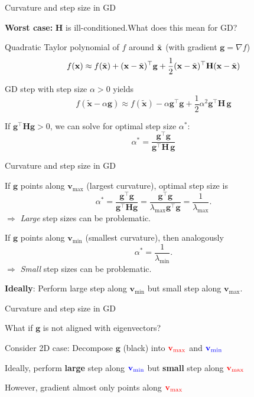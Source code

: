 \documentclass[11pt,compress,t,notes=noshow, xcolor=table]{beamer}
\begin{document}
\begin{framei}{Curvature and step size in GD}
\item\textbf{Worst case:} $\mathbf{H}$ is ill-conditioned.What does this mean for GD?
\vfill
\begin{itemizeM}
\item Quadratic Taylor polynomial of $f$ around $\tilde{\mathbf{x}}$ (with gradient $\mathbf{g} = \nabla f$)
$$f(\mathbf{x}) \approx f(\tilde{\mathbf{x}}) + (\mathbf{x} - \tilde{\mathbf{x}})^\top \mathbf{g} + \frac{1}{2} (\mathbf{x} - \tilde{\mathbf{x}})^\top \mathbf{H} (\mathbf{x} - \tilde{\mathbf{x}})$$
\item GD step with step size $\alpha > 0$ yields
$$f(\bm{\tilde{x}}-\alpha \mathbf{g}) \approx f(\bm{\tilde{x}}) - \alpha \mathbf{g}^\top\mathbf{g} + \frac{1}{2}	\alpha^2 \mathbf{g}^\top \bm{H}\,\mathbf{g}$$ 
\item If $\mathbf{g}^\top \bm{H} \mathbf{g} > 0$, we can solve for optimal step size $\alpha^\ast$:
$$\alpha^\ast = \frac{\mathbf{g}^\top \mathbf{g}}{\mathbf{g}^\top \bm{H}\, \mathbf{g}}$$
\end{itemizeM}
\end{framei}

\begin{framei}{Curvature and step size in GD}
\item If $\mathbf{g}$ points along $\mathbf{v}_{\text{max}}$ (largest curvature), optimal step size is
$$\alpha^\ast = \frac{\mathbf{g}^\top \mathbf{g}}{\mathbf{g}^\top \mathbf{H} \mathbf{g}} = \frac{\mathbf{g}^\top \mathbf{g}}{\lambda_{\text{max}} \mathbf{g}^\top \mathbf{g}} = \frac{1}{\lambda_{\text{max}}}.$$ 
$\Rightarrow$ \textit{Large} step sizes can be problematic.
\item If $\mathbf{g}$ points along $\mathbf{v}_{\text{min}}$ (smallest curvature), then analogously
$$\alpha^* = \frac{1}{\lambda_{\text{min}}}.$$
$\Rightarrow$ \textit{Small} step sizes can be problematic.
\item \textbf{Ideally}: Perform large step along $\mathbf{v}_\text{min}$ but small step along $\mathbf{v}_\text{max}$.
\end{framei}

\begin{framei}{Curvature and step size in GD}
\item What if $\mathbf{g}$ is not aligned with eigenvectors?
\item Consider 2D case: Decompose $\mathbf{g}$ (black) into $\textcolor{red}{\mathbf{v}_{\text{max}}}$ and $\textcolor{blue}{\mathbf{v}_{\text{min}}}$
\item Ideally, perform \textbf{large} step along $\textcolor{blue}{\mathbf{v}_{\text{min}}}$ but \textbf{small} step along $\textcolor{red}{\mathbf{v}_{\text{max}}}$
\item However, gradient almost only points along $\textcolor{red}{\mathbf{v}_\text{max}}$
\end{framei}
\end{document}
